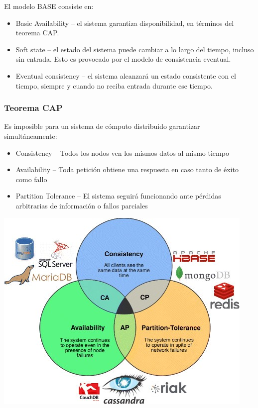 \documentclass[]{book}
\providecommand{\tightlist}{%
  \setlength{\itemsep}{0pt}\setlength{\parskip}{0pt}}
\begin{document}
El modelo BASE consiste en:

\begin{itemize}
\tightlist
\item
  Basic Availability -- el sistema garantiza disponibilidad, en términos del teorema CAP.
\item
  Soft state -- el estado del sistema puede cambiar a lo largo del tiempo, incluso sin entrada. Esto es provocado por el modelo de consistencia eventual.
\item
  Eventual consistency -- el sistema alcanzará un estado consistente con el tiempo, siempre y cuando no reciba entrada durante ese tiempo.
\end{itemize}

\hypertarget{teorema-cap}{%
\subsubsection{Teorema CAP}\label{teorema-cap}}

Es imposible para un sistema de cómputo distribuido garantizar simultáneamente:

\begin{itemize}
\tightlist
\item
  Consistency -- Todos los nodos ven los mismos datos al mismo tiempo
\item
  Availability -- Toda petición obtiene una respuesta en caso tanto de éxito como fallo
\item
  Partition Tolerance -- El sistema seguirá funcionando ante pérdidas arbitrarias de información o fallos parciales
\end{itemize}

\includegraphics{images/TeoremaCAP.jpg}
\end{document}
